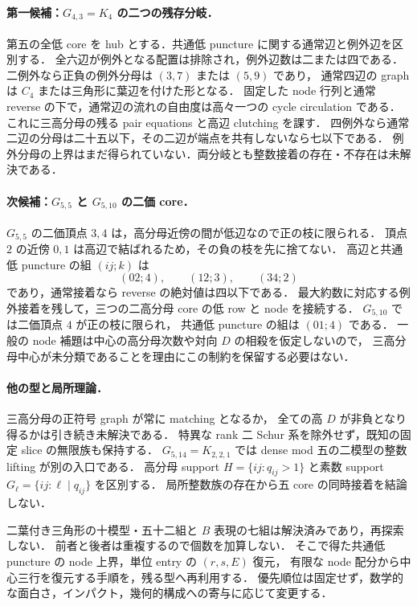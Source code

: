 \paragraph{第一候補：$G_{4,3}=K_4$ の二つの残存分岐．}
第五の全低 core を hub とする．共通低 puncture に関する通常辺と例外辺を区別する．
全六辺が例外となる配置は排除され，例外辺数は二または四である．
二例外なら正負の例外分母は $(3,7)$ または $(5,9)$ であり，
通常四辺の graph は $C_4$ または三角形に葉辺を付けた形となる．
固定した node 行列と通常 reverse の下で，通常辺の流れの自由度は高々一つの
cycle circulation である．これに三高分母の残る pair equations と高辺 clutching を課す．
四例外なら通常二辺の分母は二十五以下，その二辺が端点を共有しないなら七以下である．
例外分母の上界はまだ得られていない．両分岐とも整数接着の存在・不存在は未解決である．

\paragraph{次候補：$G_{5,5}$ と $G_{5,10}$ の二価 core．}
$G_{5,5}$ の二価頂点 $3,4$ は，高分母近傍の間が低辺なので正の枝に限られる．
頂点 $2$ の近傍 $0,1$ は高辺で結ばれるため，その負の枝を先に捨てない．
高辺と共通低 puncture の組 $(ij;k)$ は
\[
 (02;4),\qquad(12;3),\qquad(34;2)
\]
であり，通常接着なら reverse の絶対値は四以下である．
最大約数に対応する例外接着を残して，三つの二高分母 core の低 row と node を接続する．
$G_{5,10}$ では二価頂点 $4$ が正の枝に限られ，
共通低 puncture の組は $(01;4)$ である．
一般の node 補題は中心の高分母次数や対向 $D$ の相殺を仮定しないので，
三高分母中心が未分類であることを理由にこの制約を保留する必要はない．

\paragraph{他の型と局所理論．}
三高分母の正符号 graph が常に matching となるか，
全ての高 $D$ が非負となり得るかは引き続き未解決である．
特異な rank 二 Schur 系を除外せず，既知の固定 slice の無限族も保持する．
$G_{5,14}=K_{2,2,1}$ では dense mod 五の二模型の整数 lifting が別の入口である．
高分母 support $H=\{ij:q_{ij}>1\}$ と素数 support $G_\ell=\{ij:\ell\mid q_{ij}\}$ を区別する．
局所整数族の存在から五 core の同時接着を結論しない．

二葉付き三角形の十模型・五十二組と $B$ 表現の七組は解決済みであり，再探索しない．
前者と後者は重複するので個数を加算しない．
そこで得た共通低 puncture の node 上界，単位 entry の $(r,s,E)$ 復元，
有限な node 配分から中心三行を復元する手順を，残る型へ再利用する．
優先順位は固定せず，数学的な面白さ，インパクト，幾何的構成への寄与に応じて変更する．
